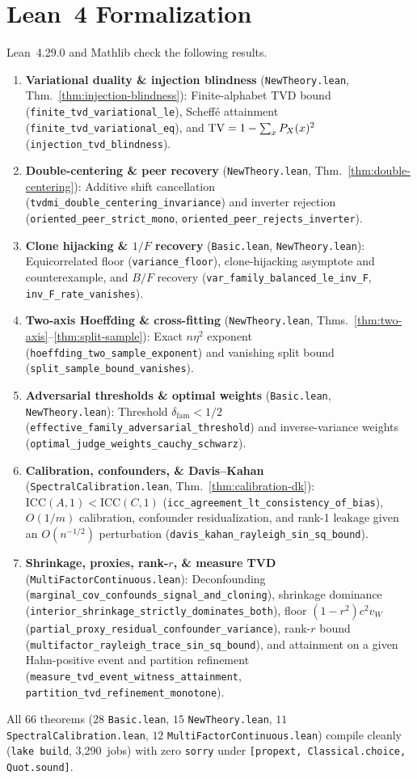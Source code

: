 \section{Lean~4 Formalization}
\label{sec:lean}

Lean~4.29.0 and Mathlib \citep{mathlib2020} check the following results.

\begin{enumerate}[leftmargin=*,itemsep=0pt,topsep=1pt]
\raggedright
\item \textbf{Variational duality \& injection blindness} (\texttt{NewTheory.lean}, Thm.~\ref{thm:injection-blindness}): Finite-alphabet TVD bound (\texttt{finite\_tvd\_variational\_le}), Scheff\'e attainment (\texttt{finite\_tvd\_variational\_eq}), and $\mathrm{TV} = 1 - \sum_x P_X(x)^2$ (\texttt{injection\_tvd\_blindness}).
\item \textbf{Double-centering \& peer recovery} (\texttt{NewTheory.lean}, Thm.~\ref{thm:double-centering}): Additive shift cancellation (\texttt{tvdmi\_double\_centering\_invariance}) and inverter rejection (\texttt{oriented\_peer\_strict\_mono}, \texttt{oriented\_peer\_rejects\_inverter}).
\item \textbf{Clone hijacking \& $1/F$ recovery} (\texttt{Basic.lean}, \texttt{NewTheory.lean}): Equicorrelated floor (\texttt{variance\_floor}), clone-hijacking asymptote and counterexample, and $B/F$ recovery (\texttt{var\_family\_balanced\_le\_inv\_F}, \texttt{inv\_F\_rate\_vanishes}).
\item \textbf{Two-axis Hoeffding \& cross-fitting} (\texttt{NewTheory.lean}, Thms.~\ref{thm:two-axis}--\ref{thm:split-sample}): Exact $n\eta^2$ exponent (\texttt{hoeffding\_two\_sample\_exponent}) and vanishing split bound (\texttt{split\_sample\_bound\_vanishes}).
\item \textbf{Adversarial thresholds \& optimal weights} (\texttt{Basic.lean}, \texttt{NewTheory.lean}): Threshold $\delta_{\mathrm{fam}} < 1/2$ (\texttt{effective\_family\_adversarial\_threshold}) and inverse-variance weights (\texttt{optimal\_judge\_weights\_cauchy\_schwarz}).
\item \textbf{Calibration, confounders, \& Davis--Kahan} (\texttt{SpectralCalibration.lean}, Thm.~\ref{thm:calibration-dk}): $\mathrm{ICC}(A,1) < \mathrm{ICC}(C,1)$ (\texttt{icc\_agreement\_lt\_consistency\_of\_bias}), $O(1/m)$ calibration, confounder residualization, and rank-1 leakage given an $O(n^{-1/2})$ perturbation (\texttt{davis\_kahan\_rayleigh\_sin\_sq\_bound}).
\item \textbf{Shrinkage, proxies, rank-$r$, \& measure TVD} (\texttt{MultiFactorContinuous.lean}): Deconfounding (\texttt{marginal\_cov\_confounds\_signal\_and\_cloning}), shrinkage dominance (\texttt{interior\_shrinkage\_strictly\_dominates\_both}), floor $(1-r^2)c^2 v_W$ (\texttt{partial\_proxy\_residual\_confounder\_variance}), rank-$r$ bound (\texttt{multifactor\_rayleigh\_trace\_sin\_sq\_bound}), and attainment on a given Hahn-positive event and partition refinement (\texttt{measure\_tvd\_event\_witness\_attainment}, \texttt{partition\_tvd\_refinement\_monotone}).
\end{enumerate}

All $66$ theorems ($28$ \texttt{Basic.lean}, $15$ \texttt{NewTheory.lean}, $11$ \texttt{SpectralCalibration.lean}, $12$ \texttt{MultiFactorContinuous.lean}) compile cleanly (\texttt{lake build}, 3,290~jobs) with zero \texttt{sorry} under \texttt{[propext, Classical.choice, Quot.sound]}.
